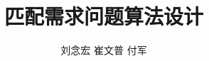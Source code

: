 \documentclass[UTF8,a4paper,zihao=-4]{ctexart}
\begin{document}
\tableofcontents
\title{匹配需求问题算法设计}
\author{刘念宏{} 崔文普{} 付军}
\date{}%
\maketitle
\end{document}

